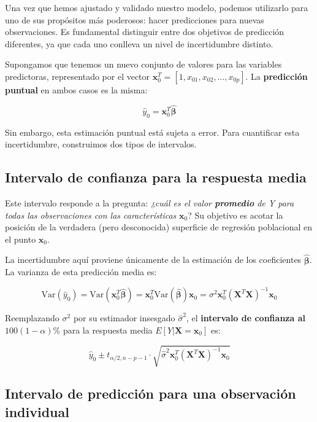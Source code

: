 \documentclass[
  letterpaper,
  DIV=11,
  numbers=noendperiod]{scrreprt}
\begin{document}
Una vez que hemos ajustado y validado nuestro modelo, podemos utilizarlo
para uno de sus propósitos más poderosos: hacer predicciones para nuevas
observaciones. Es fundamental distinguir entre dos objetivos de
predicción diferentes, ya que cada uno conlleva un nivel de
incertidumbre distinto.

Supongamos que tenemos un nuevo conjunto de valores para las variables
predictoras, representado por el vector
\(\mathbf{x}_0^T = [1, x_{01}, x_{02}, \dots, x_{0p}]\). La
\textbf{predicción puntual} en ambos casos es la misma:

\[\hat{y}_0 = \mathbf{x}_0^T \hat{\boldsymbol{\beta}}\]

Sin embargo, esta estimación puntual está sujeta a error. Para
cuantificar esta incertidumbre, construimos dos tipos de intervalos.

\subsection{Intervalo de confianza para la respuesta
media}\label{intervalo-de-confianza-para-la-respuesta-media-1}

Este intervalo responde a la pregunta: \emph{¿cuál es el valor
\textbf{promedio} de Y para todas las observaciones con las
características} \(\mathbf{x}_0\)? Su objetivo es acotar la posición de
la verdadera (pero desconocida) superficie de regresión poblacional en
el punto \(\mathbf{x}_0\).

La incertidumbre aquí proviene únicamente de la estimación de los
coeficientes \(\hat{\boldsymbol{\beta}}\). La varianza de esta
predicción media es:

\[\text{Var}(\hat{y}_0) = \text{Var}(\mathbf{x}_0^T \hat{\boldsymbol{\beta}}) = \mathbf{x}_0^T \text{Var}(\hat{\boldsymbol{\beta}}) \mathbf{x}_0 = \sigma^2 \mathbf{x}_0^T (\mathbf{X}^T\mathbf{X})^{-1} \mathbf{x}_0\]

Reemplazando \(\sigma^2\) por su estimador insesgado \(\hat{\sigma}^2\),
el \textbf{intervalo de confianza al} \(100(1-\alpha)\%\) para la
respuesta media \(E[Y|\mathbf{X}=\mathbf{x}_0]\) es:

\[\hat{y}_0 \pm t_{\alpha/2, n-p-1} \cdot \sqrt{\hat{\sigma}^2 \mathbf{x}_0^T (\mathbf{X}^T\mathbf{X})^{-1} \mathbf{x}_0}\]

\subsection{Intervalo de predicción para una observación
individual}\label{intervalo-de-predicciuxf3n-para-una-observaciuxf3n-individual}
\end{document}
